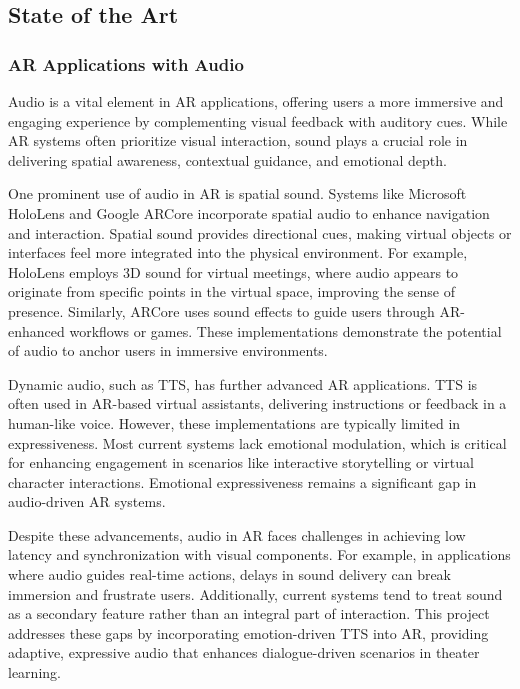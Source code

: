 \subsection{State of the Art}
\subsubsection{AR Applications with Audio}
Audio is a vital element in AR applications, offering users a more immersive and engaging experience by complementing visual feedback with auditory cues. While AR systems often prioritize visual interaction, sound plays a crucial role in delivering spatial awareness, contextual guidance, and emotional depth.

One prominent use of audio in AR is spatial sound. Systems like Microsoft HoloLens and Google ARCore\cite{oufqir2020arkit} incorporate spatial audio to enhance navigation and interaction. Spatial sound provides directional cues, making virtual objects or interfaces feel more integrated into the physical environment. For example, HoloLens employs 3D sound for virtual meetings, where audio appears to originate from specific points in the virtual space, improving the sense of presence. Similarly, ARCore uses sound effects to guide users through AR-enhanced workflows or games. These implementations demonstrate the potential of audio to anchor users in immersive environments.

Dynamic audio, such as TTS, has further advanced AR applications. TTS is often used in AR-based virtual assistants, delivering instructions or feedback in a human-like voice. However, these implementations are typically limited in expressiveness. Most current systems lack emotional modulation, which is critical for enhancing engagement in scenarios like interactive storytelling or virtual character interactions. Emotional expressiveness remains a significant gap in audio-driven AR systems.

Despite these advancements, audio in AR faces challenges in achieving low latency and synchronization with visual components. For example, in applications where audio guides real-time actions, delays in sound delivery can break immersion and frustrate users. Additionally, current systems tend to treat sound as a secondary feature rather than an integral part of interaction. This project addresses these gaps by incorporating emotion-driven TTS into AR, providing adaptive, expressive audio that enhances dialogue-driven scenarios in theater learning.

